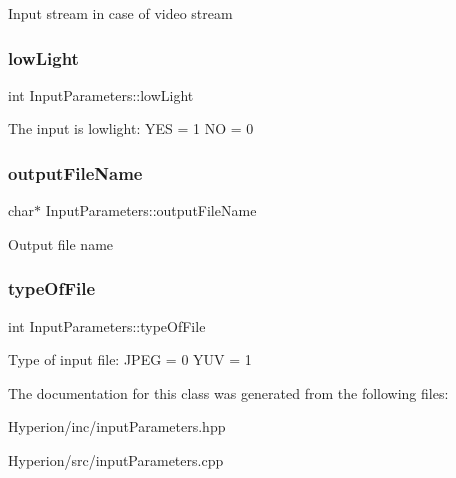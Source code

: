 Input stream in case of video stream \mbox{\label{classInputParameters_a79b3781b35f652c9ffea72703f0f69c4}} 
\subsubsection{\texorpdfstring{low\+Light}{lowLight}}
{\footnotesize\ttfamily int Input\+Parameters\+::low\+Light}

The input is lowlight\+: Y\+ES = 1 NO = 0 \mbox{\label{classInputParameters_a600055c1868b95a16fad133a356324f9}} 
\subsubsection{\texorpdfstring{output\+File\+Name}{outputFileName}}
{\footnotesize\ttfamily char$\ast$ Input\+Parameters\+::output\+File\+Name}

Output file name \mbox{\label{classInputParameters_a826c20599ad2c8d4f82f1b84055668dd}} 
\subsubsection{\texorpdfstring{type\+Of\+File}{typeOfFile}}
{\footnotesize\ttfamily int Input\+Parameters\+::type\+Of\+File}

Type of input file\+: J\+P\+EG = 0 Y\+UV = 1 

The documentation for this class was generated from the following files\+:\begin{DoxyCompactItemize}
\item 
Hyperion/inc/input\+Parameters.\+hpp\item 
Hyperion/src/input\+Parameters.\+cpp\end{DoxyCompactItemize}
